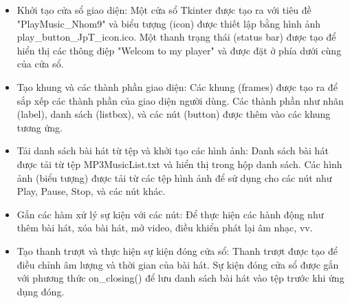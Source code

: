 \documentclass[a4paper]{article}
\begin{document}
\begin{itemize}
    \item Khởi tạo cửa sổ giao diện: Một cửa sổ Tkinter được tạo ra với tiêu đề "PlayMusic\_Nhom9" và biểu tượng (icon) được thiết lập bằng hình ảnh play\_button\_JpT\_icon.ico. Một thanh trạng thái (status bar) được tạo để hiển thị các thông điệp "Welcom to my player" và được đặt ở phía dưới cùng của cửa sổ.
    \item Tạo khung và các thành phần giao diện: Các khung (frames) được tạo ra để sắp xếp các thành phần của giao diện người dùng. Các thành phần như nhãn (label), danh sách (listbox), và các nút (button) được thêm vào các khung tương ứng.
    \item Tải danh sách bài hát từ tệp và khởi tạo các hình ảnh: Danh sách bài hát được tải từ tệp MP3MusicList.txt và hiển thị trong hộp danh sách. Các hình ảnh (biểu tượng) được tải từ các tệp hình ảnh để sử dụng cho các nút như Play, Pause, Stop, và các nút khác.
    \item Gắn các hàm xử lý sự kiện với các nút: Để thực hiện các hành động như thêm bài hát, xóa bài hát, mở video, điều khiển phát lại âm nhạc, vv.
    \item Tạo thanh trượt và thực hiện sự kiện đóng cửa sổ: Thanh trượt được tạo để điều chỉnh âm lượng và thời gian của bài hát. Sự kiện đóng cửa sổ được gắn với phương thức on\_closing() để lưu danh sách bài hát vào tệp trước khi ứng dụng đóng.
\end{itemize}
\end{document}

